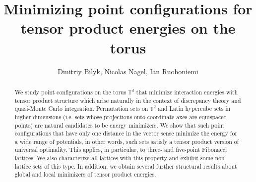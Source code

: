\documentclass[a4paper,12pt]{article}
\author{Dmitriy Bilyk, Nicolas Nagel, Ian Ruohoniemi}
\title{Minimizing point configurations for tensor product energies on the torus}
\date{}
\numberwithin{equation}{section}
\theoremstyle{definition}
\begin{document}
	
	\maketitle
	
    
\begin{abstract}
 We study point configurations on the torus $\mathbb T^d$  that  minimize interaction energies with tensor product structure which arise naturally  in the context of discrepancy theory and  quasi-Monte Carlo integration. Permutation sets on $\mathbb T^2$  and Latin hypercube sets in higher dimensions (i.e. sets whose projections onto coordinate axes are equispaced points)  are natural candidates to be energy minimizers. We show that such point configurations that have only one distance in the vector sense minimize the energy for a wide range of potentials, in other words, such sets satisfy a tensor product version of universal optimality. This applies, in particular, to three- and five-point Fibonacci lattices. We also  characterize all lattices with this property and exhibit some non-lattice sets of this type.  In addition, we obtain several further structural results about global and local minimizers of tensor product energies. 
 
\end{abstract}
\end{document}

